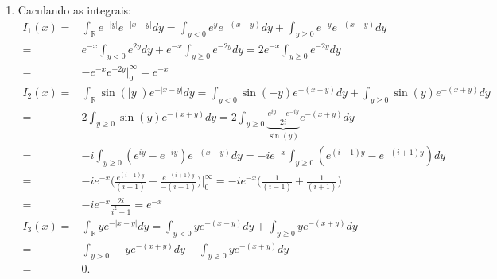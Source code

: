 \documentclass{article}
\begin{document}
\begin{enumerate}
\begin{enumerate}
\begin{enumerate}
					\item Caculando as integrais:
					$$
					\begin{aligned}
						I_{1}(x) 
						= & \int_{\mathbb{R}}e^{-|y|}e^{-|x-y|} dy = \int_{y < 0 }e^{y}e^{-(x-y)} dy + \int_{y \geq 0 }e^{-y}e^{-(x+y)} dy \\
						= & e^{-x}\int_{y < 0 }e^{2y} dy + e^{-x}\int_{y \geq 0 }e^{-2y} dy = 2e^{-x}\int_{y \geq 0 }e^{-2y} dy \\
						= & -e^{-x}e^{-2y}\Big|^{\infty}_{0} = e^{-x} \\
						I_{2}(x) 
						= & \int_{\mathbb{R}}\sin(|y|)e^{-|x-y|} dy = \int_{y < 0 }\sin(-y)e^{-(x-y)} dy + \int_{y \geq 0 }\sin(y)e^{-(x+y)} dy \\
						= & 2 \int_{y \geq 0 }\sin(y)e^{-(x+y)} dy = 2 \int_{y \geq 0 } \underbrace{\frac{e^{iy} - e^{-iy}}{2i}}_{\sin(y)} e^{-(x+y)} dy \\
						= & -i\int_{y \geq 0 }(e^{iy} - e^{-iy})e^{-(x+y)} dy = -ie^{-x}\int_{y \geq 0 }(e^{(i-1)y} - e^{-(i+1)y})dy \\
						=  & -ie^{-x}\Big( \frac{e^{(i-1)y}}{(i-1)} - \frac{e^{-(i+1)y}}{-(i+1)} \Big) \Big|^{\infty}_{0} = -ie^{-x}\Big( \frac{1}{(i-1)} + \frac{1}{(i+1)} \Big) \\
						= & -ie^{-x} \frac{2i}{i^{2} - 1} = e^{-x} \\
						I_{3}(x)
						= & \int_{\mathbb{R}} y e^{-|x-y|} dy = \int_{y < 0 }ye^{-(x-y)} dy + \int_{y \geq 0 }ye^{-(x+y)} dy \\
						= & \int_{y > 0 }-ye^{-(x+y)} dy + \int_{y \geq 0 }ye^{-(x+y)} dy \\
						= & 0.
					\end{aligned}
					$$
				\end{enumerate}
			\end{enumerate}
	\end{enumerate}
		
\end{document}
